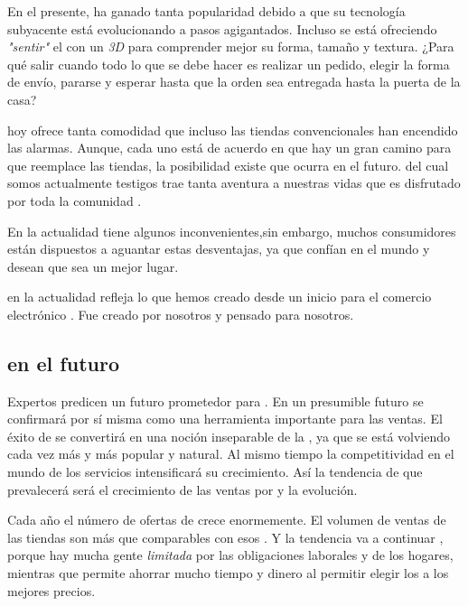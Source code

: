 			En el presente, \ecommerceCOM ha ganado tanta popularidad debido a que su tecnología subyacente está evolucionando a pasos agigantados. Incluso se está ofreciendo \textit{"sentir"} el \itemCOM con un \mousePC \textit{3D} para comprender mejor su forma, tamaño y textura. ¿Para qué salir cuando todo lo que se debe hacer es realizar un pedido, elegir la forma de envío, pararse y esperar hasta que la orden sea entregada hasta la puerta de la casa?

			\ecommerceCOM hoy ofrece tanta comodidad que incluso las tiendas convencionales han encendido las alarmas. Aunque, cada uno está de acuerdo en que hay un gran camino para que \ecommerceCOM reemplace las tiendas, la posibilidad existe que ocurra en el futuro. \ecommerceCOM del cual somos actualmente testigos trae tanta aventura a nuestras vidas que es disfrutado por toda la comunidad \online.

			En la actualidad \ecommerceCOM tiene algunos inconvenientes,sin embargo, muchos consumidores están dispuestos a aguantar estas desventajas, ya que confían en el mundo \online y desean que sea un mejor lugar.

			\ecommerceCOM en la actualidad refleja lo que hemos creado desde un inicio para el comercio electrónico \online. Fue creado por nosotros y pensado para nosotros.

		\subsection{\ecommerceCOM en el futuro}

			Expertos predicen un futuro prometedor para \ecommerceCOM. En un presumible futuro \ecommerceCOM se confirmará por sí misma como una herramienta importante para las ventas. El éxito de \ecommerceCOM se convertirá en una noción inseparable de la \webINT, ya que \eshopping se está volviendo cada vez más y más popular y natural. Al mismo tiempo la competitividad en el mundo de los servicios \ecommerceCOM intensificará su crecimiento. Así la tendencia de que prevalecerá \ecommerceCOM será el crecimiento de las ventas por \internetINT y la evolución.

			Cada año el número de ofertas de \ecommerceCOM crece enormemente. El volumen de ventas de las tiendas \online  son más que comparables con esos \brickandmortar. Y la tendencia va a continuar \cite{online_growth_ecommerce}, porque hay mucha gente \textit{limitada} por las obligaciones laborales y de los hogares, mientras que \internetINT permite ahorrar mucho tiempo y dinero al permitir  elegir los \itemsCOM a los mejores precios. 

